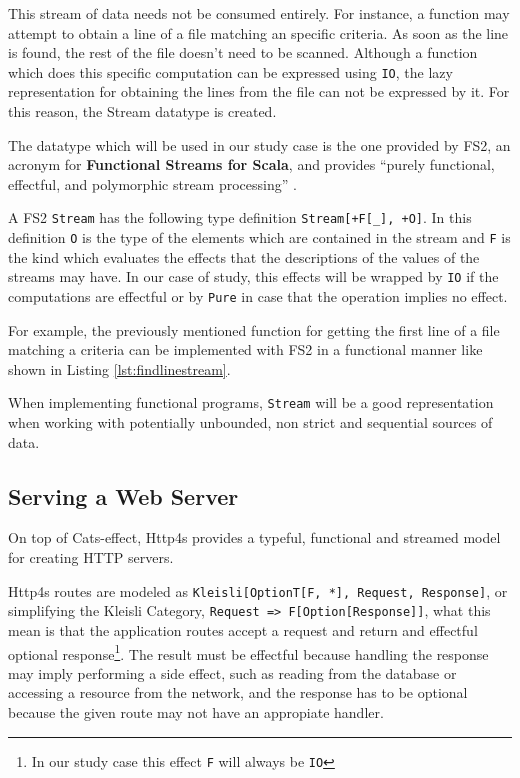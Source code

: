 \documentclass[../main.tex]{subfiles}
\begin{document}
This stream of data needs not be consumed entirely. For instance, a function may attempt to
obtain a line of a file matching an specific criteria. As soon as the line is
found, the rest of the file doesn't need to be scanned. Although a function which does
this specific computation can be expressed using \texttt{IO}, the lazy
representation for obtaining the lines from the file can not be expressed by it. For this
reason, the Stream datatype is created.

The datatype which will be used in our study case is the one provided by FS2, 
an acronym for \textbf{Functional Streams for Scala}, and provides ``purely
functional, effectful, and polymorphic stream processing'' \autocite{Fs2:Home}.

A FS2 \texttt{Stream} has the following type definition \texttt{Stream[+F[\_], +O]}. In
this definition \texttt{O} is the type of the elements which are contained in
the stream and \texttt{F} is the kind which evaluates the effects that the
descriptions of the values of the streams may have. In our case of study, this
effects will be wrapped by \texttt{IO} if the computations are effectful or by
\texttt{Pure} in case that the operation implies no effect.

For example, the previously mentioned function for getting the first line of a
file matching a criteria can be implemented with FS2 in a functional manner like
shown in Listing \ref{lst:findlinestream}.



When implementing functional programs, \texttt{Stream} will be a good representation when working with
potentially unbounded, non strict and sequential sources of data.

\subsection{Serving a Web Server}
On top of Cats-effect, Http4s provides a typeful, functional and streamed model
for creating HTTP servers.

Http4s routes are modeled as \mbox{\texttt{Kleisli[OptionT[F,
*], Request, Response]}}, or simplifying the Kleisli Category, \mbox{\lstinline{Request => F[Option[Response]]}},
what this mean is that the application routes accept a request and return and
effectful optional response\footnote{In our study case this effect \texttt{F}
  will always be \texttt{IO}}. The result must be effectful because handling the
response may imply performing a side effect, such as reading from the database or
accessing a resource from the network, and the response has to be optional
because the given route may not have an appropiate handler.
\end{document}
